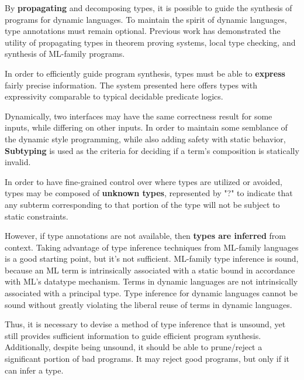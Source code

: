\documentclass[sigplan,screen]{acmart}
\begin{document}
By \textbf{propagating} and decomposing types, 
it is possible to guide the synthesis of programs for dynamic languages.
To maintain the spirit of dynamic languages, type annotations must remain optional.
Previous work has demonstrated the utility of propagating types 
in theorem proving systems, local type checking, 
and synthesis of ML-family programs.

In order to efficiently guide program synthesis, 
types must be able to \textbf{express} fairly precise information. 
The system presented here offers types with 
expressivity comparable to typical decidable predicate logics. 

Dynamically, two interfaces may have the same correctness result for some inputs,
while differing on other inputs.  
In order to maintain some semblance of the dynamic style programming,
while also adding safety with static behavior,  
\textbf{Subtyping} is used as the criteria for deciding if a term's 
composition is statically invalid.   


In order to have fine-grained control over where types are utilized or avoided, 
types may be composed of \textbf{unknown types}, represented by "?" to indicate 
that any subterm corresponding to that portion of the type 
will not be subject to static constraints.

However, if type annotations are not available, then \textbf{types are inferred} from context. 
Taking advantage of type inference techniques from ML-family languages is a good starting point,
but it's not sufficient. ML-family type inference is sound, because an ML term is 
intrinsically associated with a static bound in accordance with ML's datatype mechanism.
Terms in dynamic languages are not intrinsically associated with a principal type. 
Type inference for dynamic languages cannot be sound without greatly violating the 
liberal reuse of terms in dynamic languages. 

Thus, it is necessary to devise a method of type inference that is unsound, 
yet still provides sufficient information to guide efficient program synthesis.
Additionally, despite being unsound, it should be able to prune/reject 
a significant portion of bad programs. 
It may reject good programs, but only if it can infer a type.
\end{document}
